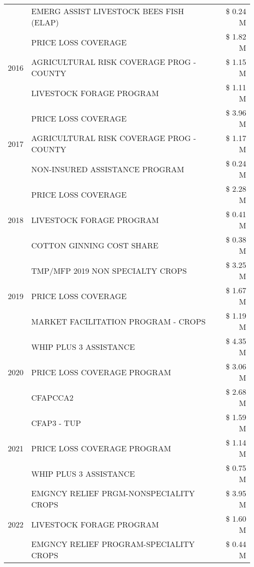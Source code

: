 \begin{tabular}{llr}
 & EMERG ASSIST LIVESTOCK BEES FISH (ELAP) & \$ 0.24 M \\
\cline{1-3}
\multirow[t]{3}{*}{2016} & PRICE LOSS COVERAGE & \$ 1.82 M \\
 & AGRICULTURAL RISK COVERAGE PROG - COUNTY & \$ 1.15 M \\
 & LIVESTOCK FORAGE PROGRAM & \$ 1.11 M \\
\cline{1-3}
\multirow[t]{3}{*}{2017} & PRICE LOSS COVERAGE & \$ 3.96 M \\
 & AGRICULTURAL RISK COVERAGE PROG - COUNTY & \$ 1.17 M \\
 & NON-INSURED ASSISTANCE PROGRAM & \$ 0.24 M \\
\cline{1-3}
\multirow[t]{3}{*}{2018} & PRICE LOSS COVERAGE & \$ 2.28 M \\
 & LIVESTOCK FORAGE PROGRAM & \$ 0.41 M \\
 & COTTON GINNING COST SHARE & \$ 0.38 M \\
\cline{1-3}
\multirow[t]{3}{*}{2019} & TMP/MFP 2019 NON SPECIALTY CROPS & \$ 3.25 M \\
 & PRICE LOSS COVERAGE & \$ 1.67 M \\
 & MARKET FACILITATION PROGRAM - CROPS & \$ 1.19 M \\
\cline{1-3}
\multirow[t]{3}{*}{2020} & WHIP PLUS 3 ASSISTANCE & \$ 4.35 M \\
 & PRICE LOSS COVERAGE PROGRAM & \$ 3.06 M \\
 & CFAPCCA2 & \$ 2.68 M \\
\cline{1-3}
\multirow[t]{3}{*}{2021} & CFAP3 - TUP & \$ 1.59 M \\
 & PRICE LOSS COVERAGE PROGRAM & \$ 1.14 M \\
 & WHIP PLUS 3 ASSISTANCE & \$ 0.75 M \\
\cline{1-3}
\multirow[t]{3}{*}{2022} & EMGNCY RELIEF PRGM-NONSPECIALITY CROPS & \$ 3.95 M \\
 & LIVESTOCK FORAGE PROGRAM & \$ 1.60 M \\
 & EMGNCY RELIEF PROGRAM-SPECIALITY CROPS & \$ 0.44 M \\
\cline{1-3}
\bottomrule
\end{tabular}
